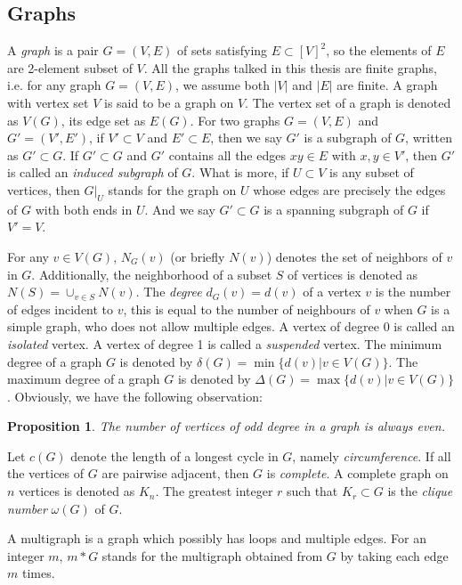 \documentclass[12pt]{report}
\newtheorem{proposition}{Proposition}
\begin{document}
\subsection{Graphs}
A {\em graph} is a pair $G=(V,E)$ of sets satisfying $E\subset[V]^2$, so the elements of $E$ are 2-element subset of $V$. All the graphs talked in this thesis are finite graphs, i.e. for any graph $G=(V,E)$, we assume both $|V|$ and $|E|$ are finite. A graph with vertex set $V$ is said to be a graph on $V$. The vertex set of a graph is denoted as $V(G)$, its edge set as $E(G)$.
For two graphs $G=(V,E)$ and $G'=(V',E')$, if $V'\subset V$ and $E'\subset E$, then we say $G'$ is a subgraph of $G$, written as $G'\subset G$. 
If $G'\subset G$ and $G'$ contains all the edges $xy\in E$ with $x,y\in V'$, then $G'$ is called an {\em induced subgraph} of $G$. What is more, if $U\subset V$ is any subset of vertices, then $G|_U$ stands for the graph on $U$ whose edges are precisely the edges of $G$ with both ends in $U$. And we say $G'\subset G$ is a spanning subgraph of $G$ if $V'=V$.

For any $v\in V(G)$, $N_G(v)$ (or briefly $N(v)$) denotes the set of neighbors of $v$ in $G$. Additionally, the neighborhood of a subset $S$ of vertices is denoted as $N(S)=\cup_{v\in S}N(v)$.
The {\em degree} $d_G(v)=d(v)$ of a vertex $v$ is the number of edges incident to $v$, this is equal to the number of neighbours of $v$ when $G$ is a simple graph, who does not allow multiple edges.
A vertex of degree 0 is called an {\em isolated} vertex. A vertex of degree 1 is called a {\em suspended} vertex. The minimum degree of a graph $G$ is denoted by $\delta(G)=\min\{d(v)|v\in V(G)\}$. The maximum degree of a graph $G$ is denoted by $\Delta(G)=\max\{d(v)|v\in V(G)\}$.
Obviously, we have the following observation:
\begin{proposition}
The number of vertices of odd degree in a graph is always even.
\end{proposition}
Let $c(G)$ denote the length of a longest cycle in $G$, namely {\em circumference}.
If all the vertices of $G$ are pairwise adjacent, then $G$ is {\em complete}. A complete graph on $n$ vertices is denoted as $K_n$.
The greatest integer $r$ such that $K_r\subset G$ is the {\em clique number} $\omega(G)$ of $G$. 




A multigraph is a graph which possibly has loops and multiple edges.
For an integer $m$, $m*G$ stands for the multigraph obtained from $G$ by taking each edge $m$ times.
\end{document}
